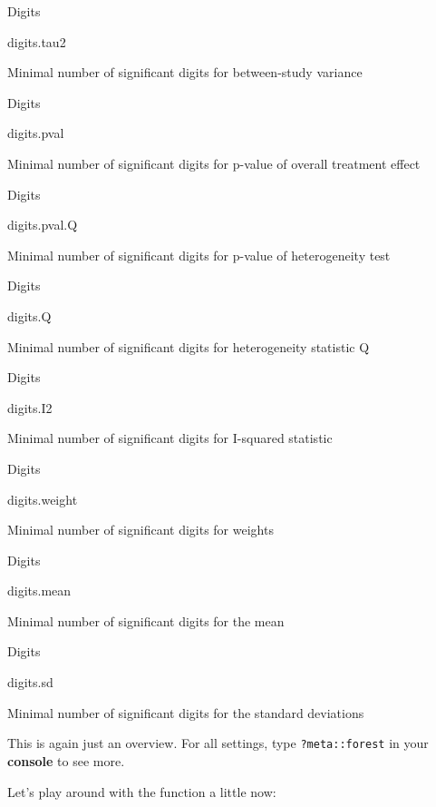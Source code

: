\documentclass[]{book}
\begin{document}
Digits

digits.tau2

Minimal number of significant digits for between-study variance

Digits

digits.pval

Minimal number of significant digits for p-value of overall treatment effect

Digits

digits.pval.Q

Minimal number of significant digits for p-value of heterogeneity test

Digits

digits.Q

Minimal number of significant digits for heterogeneity statistic Q

Digits

digits.I2

Minimal number of significant digits for I-squared statistic

Digits

digits.weight

Minimal number of significant digits for weights

Digits

digits.mean

Minimal number of significant digits for the mean

Digits

digits.sd

Minimal number of significant digits for the standard deviations

This is again just an overview. For all settings, type \texttt{?meta::forest} in your \textbf{console} to see more.

Let's play around with the function a little now:
\end{document}
